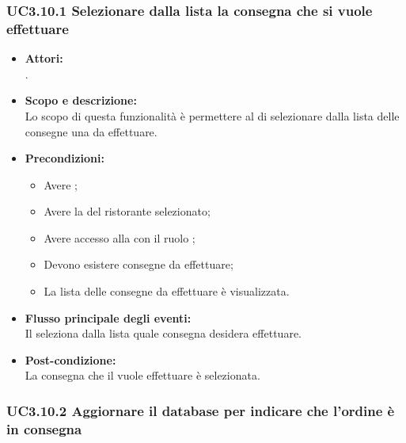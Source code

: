 \subsubsection{UC3.10.1 Selezionare dalla lista la consegna che si vuole effettuare} \label{UC3.10.1}

\begin{itemize}
	\item \textbf{Attori:}
	\\.
	\item \textbf{Scopo e descrizione:} 
	\\Lo scopo di questa funzionalità è permettere al  di selezionare dalla lista delle consegne una da effettuare.
	\item \textbf{Precondizioni:}
	\begin{itemize}
		\item Avere ;
		\item Avere la  del ristorante selezionato;
		\item Avere accesso alla  con il ruolo ;
		\item Devono esistere consegne da effettuare;
		\item La lista delle consegne da effettuare è visualizzata.
	\end{itemize}
	\item \textbf{Flusso principale degli eventi:}
	\\Il {} seleziona dalla lista quale consegna desidera effettuare.
	\item \textbf{Post-condizione:}
	\\La consegna che il  vuole effettuare è selezionata.
\end{itemize}

\subsubsection{UC3.10.2 Aggiornare il database per indicare che l'ordine è in consegna} \label{UC3.10.2}

